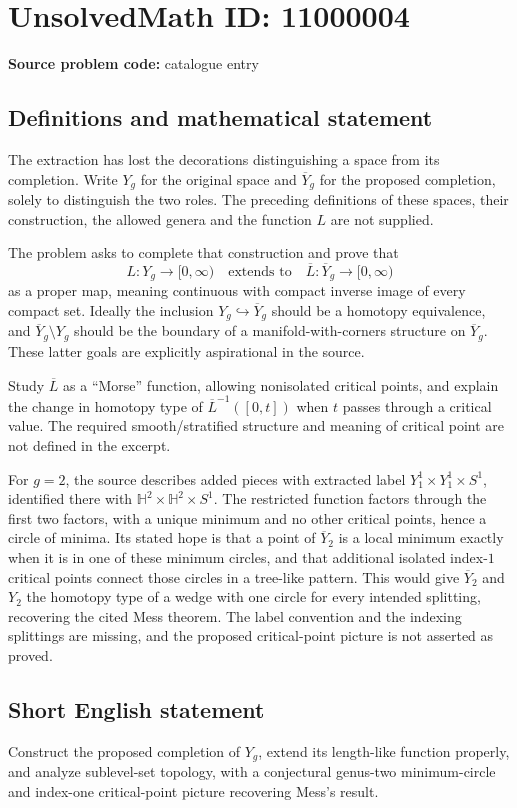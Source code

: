 \documentclass[11pt]{article}
\begin{document}
\section*{UnsolvedMath ID: 11000004}
\textbf{Source problem code:} catalogue entry
\subsection{Definitions and mathematical statement}
The extraction has lost the decorations distinguishing a space from its completion. Write \(Y_g\) for the original space and \(\overline Y_g\) for the proposed completion, solely to distinguish the two roles. The preceding definitions of these spaces, their construction, the allowed genera and the function \(L\) are not supplied.

The problem asks to complete that construction and prove that
\[
 L:Y_g\longrightarrow[0,\infty)
 \quad\text{extends to}\quad
 \overline L:\overline Y_g\longrightarrow[0,\infty)
\]
as a proper map, meaning continuous with compact inverse image of every compact set. Ideally the inclusion \(Y_g\hookrightarrow\overline Y_g\) should be a homotopy equivalence, and \(\overline Y_g\setminus Y_g\) should be the boundary of a manifold-with-corners structure on \(\overline Y_g\). These latter goals are explicitly aspirational in the source.

Study \(\overline L\) as a ``Morse'' function, allowing nonisolated critical points, and explain the change in homotopy type of
\(\overline L^{-1}([0,t])\) when \(t\) passes through a critical value. The required smooth/stratified structure and meaning of critical point are not defined in the excerpt.

For \(g=2\), the source describes added pieces with extracted label \(Y_1^1\times Y_1^1\times S^1\), identified there with \(\mathbb H^2\times\mathbb H^2\times S^1\). The restricted function factors through the first two factors, with a unique minimum and no other critical points, hence a circle of minima. Its stated hope is that a point of \(\overline Y_2\) is a local minimum exactly when it is in one of these minimum circles, and that additional isolated index-\(1\) critical points connect those circles in a tree-like pattern. This would give \(\overline Y_2\) and \(Y_2\) the homotopy type of a wedge with one circle for every intended splitting, recovering the cited Mess theorem. The label convention and the indexing splittings are missing, and the proposed critical-point picture is not asserted as proved.
\subsection{Short English statement}
Construct the proposed completion of \(Y_g\), extend its length-like function properly, and analyze sublevel-set topology, with a conjectural genus-two minimum-circle and index-one critical-point picture recovering Mess's result.
\end{document}
